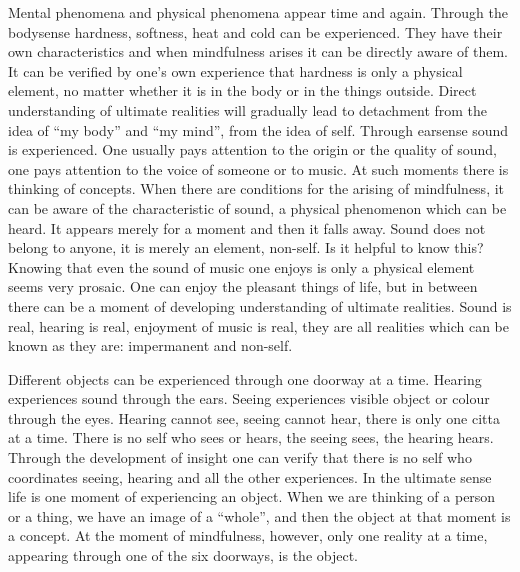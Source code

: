 \documentclass{book}
\begin{document}
Mental phenomena and physical phenomena appear time and again. Through
the bodysense hardness, softness, heat and cold can be experienced. They
have their own characteristics and when mindfulness arises it can be
directly aware of them. It can be verified by one's own experience that
hardness is only a physical element, no matter whether it is in the body
or in the things outside. Direct understanding of ultimate realities
will gradually lead to detachment from the idea of ``my body'' and ``my
mind'', from the idea of self. Through earsense sound is experienced.
One usually pays attention to the origin or the quality of sound, one
pays attention to the voice of someone or to music. At such moments
there is thinking of concepts. When there are conditions for the arising
of mindfulness, it can be aware of the character­istic of sound, a
physical phenomenon which can be heard. It appears merely for a moment
and then it falls away. Sound does not belong to anyone, it is merely an
element, non-self. Is it helpful to know this? Knowing that even the
sound of music one enjoys is only a physical element seems very prosaic.
One can enjoy the pleasant things of life, but in between there can be a
moment of developing under­standing of ultimate realities. Sound is
real, hearing is real, enjoyment of music is real, they are all
realities which can be known as they are: impermanent and non-self.

Different objects can be experienced through one door­way at a time.
Hearing experiences sound through the ears. Seeing experiences visible
object or colour through the eyes. Hearing cannot see, seeing cannot
hear, there is only one citta at a time. There is no self who sees or
hears, the seeing sees, the hearing hears. Through the develop­ment of
insight one can verify that there is no self who coordinates seeing,
hearing and all the other experiences. In the ultimate sense life is one
moment of experiencing an object. When we are thinking of a person or a
thing, we have an image of a ``whole'', and then the object at that
moment is a concept. At the moment of mindfulness, however, only one
reality at a time, appear­ing through one of the six doorways, is the
object.
\end{document}

